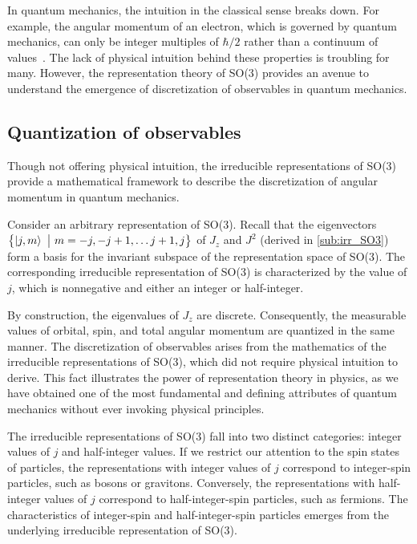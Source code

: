 In quantum mechanics, the intuition in the classical sense breaks down. For example, the angular momentum of an electron, which is governed by quantum mechanics, can only be integer multiples of $\hbar/2$ rather than a continuum of values~\cite{Griffiths2018,Hall2013}. The lack of physical intuition behind these properties is troubling for many. However, the representation theory of SO(3) provides an avenue to understand the emergence of discretization of observables in quantum mechanics.

\subsection{Quantization of observables}
Though not offering physical intuition, the irreducible representations of SO(3) provide a mathematical framework to describe the discretization of angular momentum in quantum mechanics.

\sloppy Consider an arbitrary representation of SO(3). Recall that the eigenvectors $\left\{ \ket{j,m}~\big|~ m=-j,-j+1,\dots j+1,j \right\}$ of $J_z$ and $J^2$ (derived in \cref{sub:irr_SO3}) form a basis for the invariant subspace of the representation space of SO(3). The corresponding irreducible representation of SO(3) is characterized by the value of $j$, which is nonnegative and either an integer or half-integer.

By construction, the eigenvalues of $J_z$ are discrete. Consequently, the measurable values of orbital, spin, and total angular momentum are quantized in the same manner. The discretization of observables arises from the mathematics of the irreducible representations of SO(3), which did not require physical intuition to derive. This fact illustrates the power of representation theory in physics, as we have obtained one of the most fundamental and defining attributes of quantum mechanics without ever invoking physical principles.

The irreducible representations of SO(3) fall into two distinct categories: integer values of $j$ and half-integer values. If we restrict our attention to the spin states of particles, the representations with integer values of $j$ correspond to integer-spin particles, such as bosons or gravitons. Conversely, the representations with half-integer values of $j$ correspond to half-integer-spin particles, such as fermions. The characteristics of integer-spin and half-integer-spin particles emerges from the underlying irreducible representation of SO(3).

